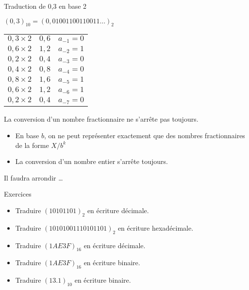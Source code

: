 \begin{frame}{Traduction de 0,3 en base 2}


  \begin{exampleblock}{$(0,3)_{10} = (0,01001100110011 \ldots)_2$}
    \begin{tabular}{r@{ = }ll}

      $0,3\times2$         & $0,6$ & $a_{-1} = 0$ \\
      $0,6\times2$         & $1,2$ & $a_{-2} = 1$ \\
      \alert{$0,2\times2$} & $0,4$ & $a_{-3} = 0$ \\
      $0,4\times2$         & $0,8$ & $a_{-4} = 0$ \\
       $0,8\times2$        & $1,6$ & $a_{-5} = 1$ \\
       $0,6\times2$        & $1,2$ & $a_{-6} = 1$ \\
      \alert{$0,2\times2$} & $0,4$ & $a_{-7} = 0$ \\
      
    \end{tabular}
  \end{exampleblock}

  \begin{alertblock}{La conversion d’un nombre fractionnaire ne s’arrête pas toujours.}
    \begin{itemize}
    \item En base $b$,  on ne peut représenter exactement que des nombres fractionnaires de la forme $X/b^k$
    \item  La conversion d’un nombre entier s’arrête toujours.
    \end{itemize}
  \end{alertblock}
  \begin{alertblock}{Il faudra arrondir \dots}
  \end{alertblock}
\end{frame}



\begin{frame}{Exercices}
  \begin{itemize}
  \item Traduire $(10101101)_2$ en écriture décimale.
  \item Traduire $(10101001110101101)_2$ en écriture hexadécimale.
  \item Traduire $(1AE3F)_{16}$ en écriture décimale.
  \item Traduire $(1AE3F)_{16}$ en écriture binaire.
  \item Traduire $(13.1)_{10}$ en écriture binaire.
  \end{itemize}
\end{frame}


